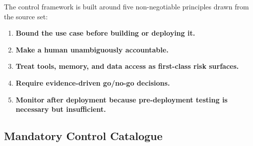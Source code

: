 \documentclass[11pt,a4paper]{article}
\begin{document}
The control framework is built around five non-negotiable principles drawn from the source set:

\begin{enumerate}[nosep]
    \item \textbf{Bound the use case before building or deploying it.}
    \item \textbf{Make a human unambiguously accountable.}
    \item \textbf{Treat tools, memory, and data access as first-class risk surfaces.}
    \item \textbf{Require evidence-driven go/no-go decisions.}
    \item \textbf{Monitor after deployment because pre-deployment testing is necessary but insufficient.}
\end{enumerate}

\subsection{Mandatory Control Catalogue}
\end{document}
